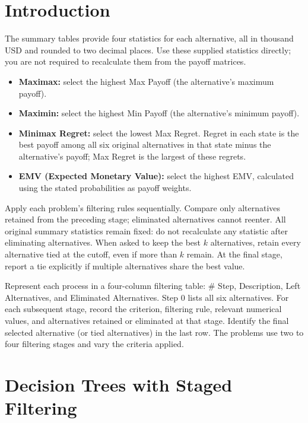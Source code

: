 \section{Introduction}\label{sec:c9-introduction}
The summary tables provide four statistics for each alternative, all in thousand USD and rounded to two decimal places. Use these supplied statistics directly; you are not required to recalculate them from the payoff matrices.
\begin{itemize}
\item \textbf{Maximax:} select the highest Max Payoff (the alternative's maximum payoff).
\item \textbf{Maximin:} select the highest Min Payoff (the alternative's minimum payoff).
\item \textbf{Minimax Regret:} select the lowest Max Regret. Regret in each state is the best payoff among all six original alternatives in that state minus the alternative's payoff; Max Regret is the largest of these regrets.
\item \textbf{EMV (Expected Monetary Value):} select the highest EMV, calculated using the stated probabilities as payoff weights.
\end{itemize}
Apply each problem's filtering rules sequentially. Compare only alternatives retained from the preceding stage; eliminated alternatives cannot reenter. All original summary statistics remain fixed: do not recalculate any statistic after eliminating alternatives. When asked to keep the best $k$ alternatives, retain every alternative tied at the cutoff, even if more than $k$ remain. At the final stage, report a tie explicitly if multiple alternatives share the best value.

Represent each process in a four-column filtering table: \# Step, Description, Left Alternatives, and Eliminated Alternatives. Step 0 lists all six alternatives. For each subsequent stage, record the criterion, filtering rule, relevant numerical values, and alternatives retained or eliminated at that stage. Identify the final selected alternative (or tied alternatives) in the last row. The problems use two to four filtering stages and vary the criteria applied.

\section{Decision Trees with Staged Filtering}\label{sec:c9-filtering}

